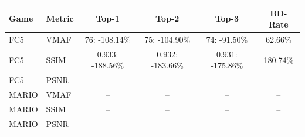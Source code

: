 \begin{tabular}{llcccc}
\toprule
Game & Metric & Top-1 & Top-2 & Top-3 & BD-Rate \\
\midrule
FC5 & VMAF & 76: -108.14\% & 75: -104.90\% & 74: -91.50\% & 62.66\% \\
FC5 & SSIM & 0.933: -188.56\% & 0.932: -183.66\% & 0.931: -175.86\% & 180.74\% \\
FC5 & PSNR & -- & -- & -- & -- \\
\midrule
MARIO & VMAF & -- & -- & -- & -- \\
MARIO & SSIM & -- & -- & -- & -- \\
MARIO & PSNR & -- & -- & -- & -- \\
\bottomrule
\end{tabular}
